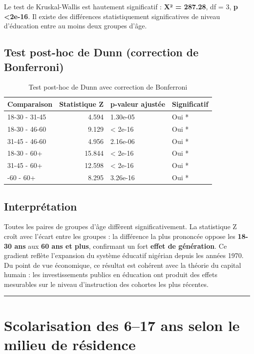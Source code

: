 \documentclass[
]{article}
\begin{document}
Le test de Kruskal-Wallis est hautement significatif : \textbf{X² =
287.28}, df = 3, \textbf{p \textless2e-16}. Il existe des différences
statistiquement significatives de niveau d'éducation entre au moins deux
groupes d'âge.

\subsection{Test post-hoc de Dunn (correction de
Bonferroni)}\label{test-post-hoc-de-dunn-correction-de-bonferroni}

\begin{longtable}[t]{lrll}
\caption{\label{tab:tableau-dunn}Test post-hoc de Dunn avec correction de Bonferroni}\\
\toprule
Comparaison & Statistique Z & p-valeur ajustée & Significatif\\
\midrule
18-30 - 31-45 & 4.594 & 1.30e-05 & Oui *\\
18-30 - 46-60 & 9.129 & < 2e-16 & Oui *\\
31-45 - 46-60 & 4.956 & 2.16e-06 & Oui *\\
18-30 - 60+ & 15.844 & < 2e-16 & Oui *\\
31-45 - 60+ & 12.598 & < 2e-16 & Oui *\\
\addlinespace
46-60 - 60+ & 8.295 & 3.26e-16 & Oui *\\
\bottomrule
\end{longtable}

\subsection{Interprétation}\label{interpruxe9tation-2}

Toutes les paires de groupes d'âge diffèrent significativement. La
statistique Z croît avec l'écart entre les groupes : la différence la
plus prononcée oppose les \textbf{18-30 ans} aux \textbf{60 ans et
plus}, confirmant un fort \textbf{effet de génération}. Ce gradient
reflète l'expansion du système éducatif nigérian depuis les années 1970.
Du point de vue économique, ce résultat est cohérent avec la théorie du
capital humain : les investissements publics en éducation ont produit
des effets mesurables sur le niveau d'instruction des cohortes les plus
récentes.

\begin{center}\rule{0.5\linewidth}{0.5pt}\end{center}

\section{Scolarisation des 6--17 ans selon le milieu de
résidence}\label{scolarisation-des-617-ans-selon-le-milieu-de-ruxe9sidence}
\end{document}
